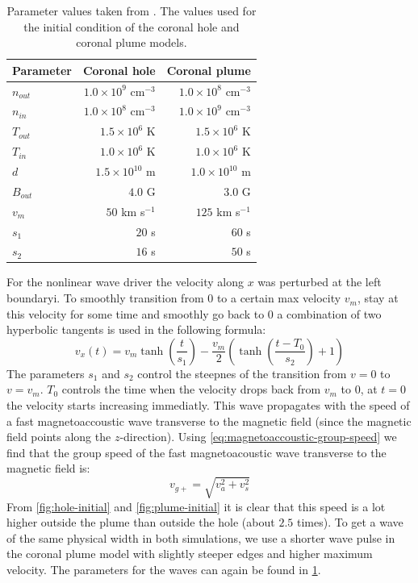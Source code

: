 \begin{table}[H]
	\centering
	\begin{tabular}{|l|r|r|}
		\toprule
		Parameter & Coronal hole & Coronal plume\\
		\midrule
		$n_{out}$ & $1.0\times 10^9$ cm$^{-3}$ & $1.0\times 10^8$ cm$^{-3}$\\
		$n_{in}$ & $1.0\times 10^8$ cm$^{-3}$ & $1.0\times 10^9$ cm$^{-3}$\\
		$T_{out}$ & $1.5\times 10^6$ K & $1.5\times 10^6$ K\\
		$T_{in}$ & $1.0\times10^6$ K & $1.0\times10^6$ K\\
		$d$ & $1.5\times10^{10}$ m& $1.0\times10^{10}$ m \\
		$B_{out} $ & $4.0$ G & $3.0$ G\\
		\midrule
		$v_m$ & $50$ km s$^{-1}$ & $125$ km s$^{-1}$ \\
		$s_1$ & $20$ s & $60$ s \\
		$s_2$ & $16$ s& $50$ s\\
		\bottomrule
	\end{tabular}
	\caption{Parameter values taken from \cite{coronal-hole}. The values used for the initial condition of the coronal hole and coronal plume models.}
	\label{tab:parameters-hole}
\end{table}
For the nonlinear wave driver the velocity along $x$ was perturbed at the left boundaryi. 
To smoothly transition from $0$ to a certain max velocity $v_m$, stay at this velocity for some time and smoothly go back to $0$ a combination of two hyperbolic tangents is used in the following formula:
\begin{equation}
	v_x(t) = v_m \tanh \left( \frac{t}{s_1} \right) - \frac{v_m}{2} \left( \tanh \left( \frac{t-T_0}{s_2} \right) +1 \right) 
\end{equation}
The parameters $s_1$ and $s_2$ control the steepnes of the transition from $v=0$ to $v=v_m$.
$T_0$ controls the time when the velocity drops back from $v_m$ to $0$, at $t=0$ the velocity starts increasing immediatly.
This wave propagates with the speed of a fast magnetoaccoustic wave transverse to the magnetic field (since the magnetic field points along the $z$-direction).
Using \cref{eq:magnetoaccoustic-group-speed} we find that the group speed of the fast magnetoacoustic wave transverse to the magnetic field is:
\begin{equation*}
	v_{g+} = \sqrt{v_a^2+v_s^2}
\end{equation*}
From \cref{fig:hole-initial} and \cref{fig:plume-initial} it is clear that this speed is a lot higher outside the plume than outside the hole (about $2.5$ times).
To get a wave of the same physical width in both simulations, we use a shorter wave pulse in the coronal plume model with slightly steeper edges and higher maximum velocity.
The parameters for the waves can again be found in \cref{tab:parameters-hole}.

